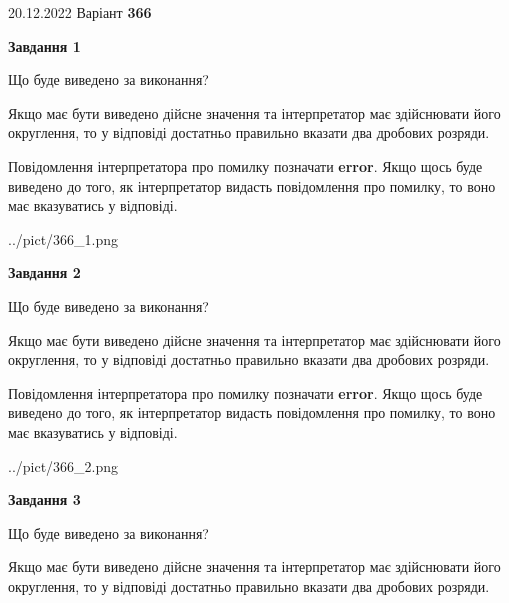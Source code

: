 \documentclass[12pt, ukrainian]{article}
\begin{document}
{20.12.2022 Варіант \No \textbf { 366 }\par}
{
\begin {Large}

{\begin {center}\textbf{Завдання 1}\end {center}}\par
Що буде виведено за виконання? \par

Якщо має бути виведено дійсне значення та інтерпретатор має здійснювати його округлення, 
то у відповіді достатньо правильно вказати два дробових розряди.

Повідомлення інтерпретатора про помилку позначати \textbf{error}.
Якщо щось буде виведено до того, як інтерпретатор видасть повідомлення про помилку, 
то воно має вказуватись у відповіді. \par

\begin{center}
	{../pict/366_1.png}
\end{center}
\newpage

{\begin {center}\textbf{Завдання 2}\end {center}}\par
Що буде виведено за виконання? \par

Якщо має бути виведено дійсне значення та інтерпретатор має здійснювати його округлення, 
то у відповіді достатньо правильно вказати два дробових розряди.

Повідомлення інтерпретатора про помилку позначати \textbf{error}.
Якщо щось буде виведено до того, як інтерпретатор видасть повідомлення про помилку, 
то воно має вказуватись у відповіді. \par

\begin{center}
	{../pict/366_2.png}
\end{center}
\newpage

{\begin {center}\textbf{Завдання 3}\end {center}}\par
Що буде виведено за виконання? \par

Якщо має бути виведено дійсне значення та інтерпретатор має здійснювати його округлення, 
то у відповіді достатньо правильно вказати два дробових розряди.


\end{Large}}
\end{document}
